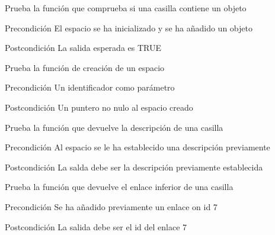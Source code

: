\begin{DoxyRefList}
\item[\label{test__test000311}%
\hypertarget{test__test000311}{}%
Global \hyperlink{space__test_8c_ae0baf50581fb48e4b583a1b941d78c05}{test1\-\_\-space\-\_\-contains\-\_\-object} ()]Prueba la función que comprueba si una casilla contiene un objeto \begin{DoxyPrecond}{Precondición}
El espacio se ha inicializado y se ha añadido un objeto 
\end{DoxyPrecond}
\begin{DoxyPostcond}{Postcondición}
La salida esperada es T\-R\-U\-E  
\end{DoxyPostcond}

\item[\label{test__test000239}%
\hypertarget{test__test000239}{}%
Global \hyperlink{space__test_8c_a69278cc022dc5688d4725f8d36317b30}{test1\-\_\-space\-\_\-create} ()]Prueba la función de creación de un espacio \begin{DoxyPrecond}{Precondición}
Un identificador como parámetro 
\end{DoxyPrecond}
\begin{DoxyPostcond}{Postcondición}
Un puntero no nulo al espacio creado  
\end{DoxyPostcond}

\item[\label{test__test000276}%
\hypertarget{test__test000276}{}%
Global \hyperlink{space__test_8c_a9a9da97ed6f49f2ae325177caecfea9c}{test1\-\_\-space\-\_\-get\-\_\-description} ()]Prueba la función que devuelve la descripción de una casilla \begin{DoxyPrecond}{Precondición}
Al espacio se le ha establecido una descripción previamente 
\end{DoxyPrecond}
\begin{DoxyPostcond}{Postcondición}
La salda debe ser la descripción previamente establecida  
\end{DoxyPostcond}

\item[\label{test__test000301}%
\hypertarget{test__test000301}{}%
Global \hyperlink{space__test_8c_a31b56fea7bd46484d0e2e21dda7add5d}{test1\-\_\-space\-\_\-get\-\_\-down} ()]Prueba la función que devuelve el enlace inferior de una casilla \begin{DoxyPrecond}{Precondición}
Se ha añadido previamente un enlace on id 7 
\end{DoxyPrecond}
\begin{DoxyPostcond}{Postcondición}
La salida debe ser el id del enlace 7  
\end{DoxyPostcond}


\end{DoxyRefList}
